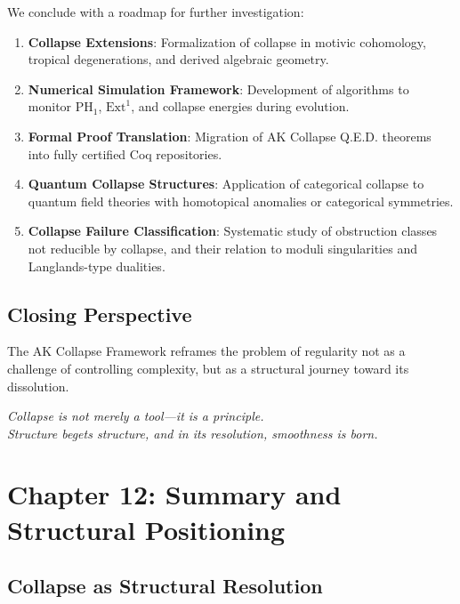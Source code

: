 \documentclass[11pt]{article}
\begin{document}
We conclude with a roadmap for further investigation:

\begin{enumerate}
  \item \textbf{Collapse Extensions}:
  Formalization of collapse in motivic cohomology, tropical degenerations, and derived algebraic geometry.

  \item \textbf{Numerical Simulation Framework}:
  Development of algorithms to monitor \( \mathrm{PH}_1 \), \( \mathrm{Ext}^1 \), and collapse energies during evolution.

  \item \textbf{Formal Proof Translation}:
  Migration of AK Collapse Q.E.D. theorems into fully certified Coq repositories.

  \item \textbf{Quantum Collapse Structures}:
  Application of categorical collapse to quantum field theories with homotopical anomalies or categorical symmetries.

  \item \textbf{Collapse Failure Classification}:
  Systematic study of obstruction classes not reducible by collapse, and their relation to moduli singularities and Langlands-type dualities.
\end{enumerate}

\subsection{Closing Perspective}

The AK Collapse Framework reframes the problem of regularity not as a challenge of controlling complexity, but as a structural journey toward its dissolution.

\begin{center}
\textit{Collapse is not merely a tool---it is a principle.  
\\[0.5em]
Structure begets structure, and in its resolution, smoothness is born.}
\end{center}



\section{Chapter 12: Summary and Structural Positioning}
\label{sec:summary-collapse}

\subsection{Collapse as Structural Resolution}
\end{document}
